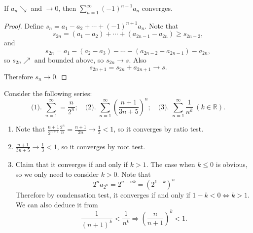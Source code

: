 \begin{theorem}\label{thm:Alternating series test}
    If $a_n\searrow$ and $ \to 0 $, then $ \sum_{n=1}^{\infty}(-1)^{n+1}a_n $ converges.
\end{theorem}
\begin{proof}
    Define $ s_n = a_1-a_2+\cdots+(-1)^{n+1}a_n $. Note that 
    \[
        s_{2n} = (a_1-a_2)+\cdots+(a_{2n-1}-a_{2n})\ge s_{2n-2},
    \]
    and 
    \[
        s_{2n} = a_1 - (a_2-a_3)-\cdots-(a_{2n-2}-a_{2n-1}) - a_{2n},
    \]
    so $ s_{2n} \nearrow $ and bounded above, so $ s_{2n}\to s $. Also
    \[
        s_{2n+1}=s_{2n}+a_{2n+1}\to s.
    \]
    Therefore $ s_n\to 0 $.
\end{proof}

\begin{example}
    Consider the following series: 
    \[ 
        \text{(1). } \sum_{n=1}^{\infty} = \frac{n}{2^n};\quad \text{(2). } \sum_{n=1}^{\infty}\left( \frac{n+1}{3n+5} \right)^{n}; \quad \text{(3). } \sum_{n=1}^{\infty}\frac{1}{n^k}\ (k\in \mathbb{R}).
    \]

    \begin{enumerate}[(1).]
        \item Note that $ \frac{n+1}{2^{n+1}}\frac{2^n}{n}=\frac{n+1}{2n}\to \frac{1}{2}<1 $, so it converges by ratio test.
        \item $ \frac{n+1}{3n+5}\to \frac{1}{3}<1 $, so it converges by root test.
        \item Claim that it converges if and only if $k>1$. The case when $ k\le 0 $ is obvious, so we only need to consider $k>0$. Note that 
        \[
            2^na_{2^n} = 2^{n-nk}=(2^{1-k})^n
        \]
        Therefore by condensation test, it converges if and only if $ 1-k<0 \Leftrightarrow k>1 $. We can also deduce it from 
        \[
            \frac{1}{(n+1)^k}<\frac{1}{n^k} \Longrightarrow \left( \frac{n}{n+1} \right)^k<1.
        \]
    \end{enumerate}
\end{example}